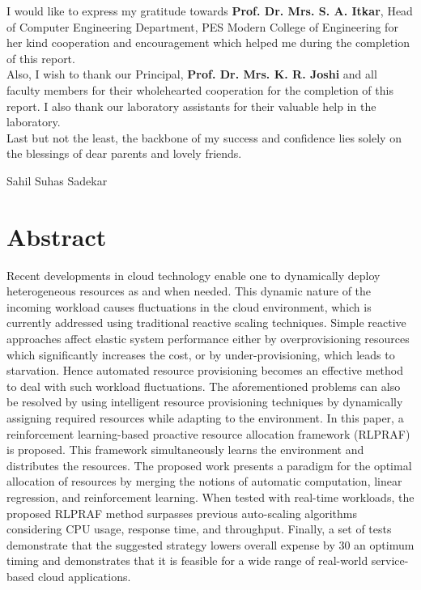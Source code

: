 \documentclass[12pt,a4paper,final]{report}
\begin{document}
I would like to express my gratitude towards \textbf{Prof. Dr. Mrs. S. A. Itkar},  Head of Computer Engineering Department, PES Modern College of Engineering for her kind cooperation and encouragement which helped me during the completion of this report.\\

Also, I wish to thank our Principal, \textbf{Prof. Dr. Mrs. K. R. Joshi} and all faculty members for their wholehearted cooperation for the completion of this report. I also thank our laboratory assistants for their valuable help in the laboratory. \\

Last but not the least, the backbone of my success and confidence lies solely on the blessings of dear parents and lovely friends.

\vspace{3\baselineskip}
\begin{flushright}
Sahil Suhas Sadekar\\
\end{flushright}



\pagestyle{plain} 
\cleardoublepage
{}
\tableofcontents
\newpage

\Large
\chapter*{\centering Abstract}
\normalsize
\noindent
 Recent developments in cloud technology enable one to dynamically deploy heterogeneous resources as 
and when needed. This dynamic nature of the incoming workload causes fluctuations in the cloud environment, which 
is currently addressed using traditional reactive scaling techniques. Simple reactive approaches affect elastic system 
performance either by overprovisioning resources which significantly increases the cost, or by under-provisioning, 
which leads to starvation. Hence automated resource provisioning becomes an effective method to deal with such 
workload fluctuations. The aforementioned problems can also be resolved by using intelligent resource provisioning 
techniques by dynamically assigning required resources while adapting to the environment. In this paper, a 
reinforcement learning-based proactive resource allocation framework (RLPRAF) is proposed. This framework 
simultaneously learns the environment and distributes the resources. The proposed work presents a paradigm for the 
optimal allocation of resources by merging the notions of automatic computation, linear regression, and 
reinforcement learning. When tested with real-time workloads, the proposed RLPRAF method surpasses previous 
auto-scaling algorithms considering CPU usage, response time, and throughput. Finally, a set of tests demonstrate 
that the suggested strategy lowers overall expense by 30%
an optimum timing and demonstrates that it is feasible for a wide range of real-world service-based cloud applications. 
\newpage
\end{document}
